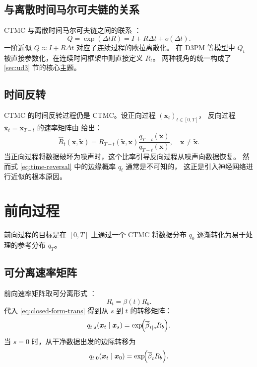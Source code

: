 \documentclass[12pt,a4paper]{ctexbook}
\theoremstyle{definition}
\begin{document}
\subsection{与离散时间马尔可夫链的关系}

CTMC 与离散时间马尔可夫链之间的联系 \cite[Appendix A]{austin2021d3pm}：
\begin{equation}
Q = \exp(\Delta t R) = I + R \Delta t + o(\Delta t). \label{eq:embedding}
\end{equation}
一阶近似 $Q \approx I + R \Delta t$ 对应了连续过程的欧拉离散化。
在 D3PM 等模型中 $Q_t$ 被直接参数化，在连续时间框架中则直接定义 $R_t$。
两种视角的统一构成了 \ref{sec:ud3} 节的核心主题。

\subsection{时间反转}

CTMC 的时间反转过程仍是 CTMC。设正向过程 $(\boldsymbol{x}_t)_{t \in [0, T]}$，
反向过程 $\bar{\boldsymbol{x}}_t = \boldsymbol{x}_{T - t}$ 的速率矩阵由
\cite[§3.1 Proposition 1]{campbell2022ctmc} 给出：
\begin{equation}
\hat{R}_t(\boldsymbol{x}, \tilde{\boldsymbol{x}}) = R_{T-t}(\tilde{\boldsymbol{x}}, \boldsymbol{x}) \frac{q_{T-t}(\tilde{\boldsymbol{x}})}{q_{T-t}(\boldsymbol{x})}, \quad \boldsymbol{x} \neq \tilde{\boldsymbol{x}}. \label{eq:time-reversal}
\end{equation}
当正向过程将数据破坏为噪声时，这个比率引导反向过程从噪声向数据恢复。
然而式 \eqref{eq:time-reversal} 中的边缘概率 $q_t$ 通常是不可知的，
这正是引入神经网络进行近似的根本原因。

\section{前向过程}
\label{sec:forward}

前向过程的目标是在 $[0, T]$ 上通过一个 CTMC 将数据分布 $q_0$ 逐渐转化为易于处理的参考分布 $q_T$。

\subsection{可分离速率矩阵}

前向速率矩阵取可分离形式 \cite[§4.1]{campbell2022ctmc}\cite[§2.1]{zhao2025ud3}：
\begin{equation}
R_t = \beta(t) R_b. \label{eq:separable-forward}
\end{equation}
代入 \eqref{eq:closed-form-trans} 得到从 $s$ 到 $t$ 的转移矩阵：
\begin{equation}
q_{t|s}(\boldsymbol{x}_t \mid \boldsymbol{x}_s) = \exp\!\Bigl( \overline{\beta}_{t|s} R_b \Bigr). \label{eq:trans-s-to-t}
\end{equation}
当 $s = 0$ 时，从干净数据出发的边际转移为
\begin{equation}
q_{t|0}(\boldsymbol{x}_t \mid \boldsymbol{x}_0) = \exp\!\Bigl( \overline{\beta}_{t} R_b \Bigr). \label{eq:trans-t-to-0}
\end{equation}
\end{document}
